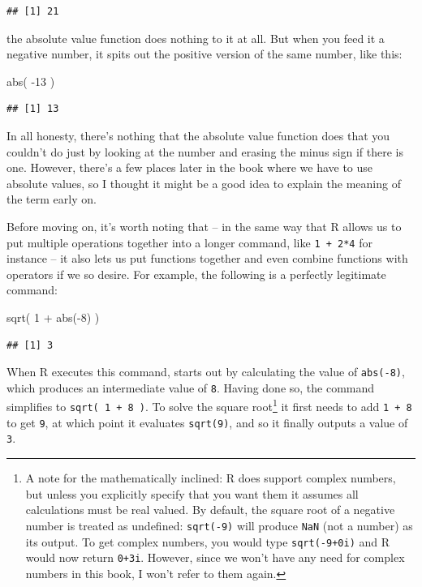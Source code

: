 \documentclass[
]{book}
\newenvironment{Shaded}{\begin{snugshade}}{\end{snugshade}}
\newcommand{\DecValTok}[1]{\textcolor[rgb]{0.00,0.00,0.81}{#1}}
\newcommand{\FunctionTok}[1]{\textcolor[rgb]{0.00,0.00,0.00}{#1}}
\newcommand{\NormalTok}[1]{#1}
\newcommand{\SpecialCharTok}[1]{\textcolor[rgb]{0.00,0.00,0.00}{#1}}
\begin{document}
\begin{verbatim}
## [1] 21
\end{verbatim}

the absolute value function does nothing to it at all. But when you feed it a negative number, it spits out the positive version of the same number, like this:

\begin{Shaded}
\begin{Highlighting}[]
\FunctionTok{abs}\NormalTok{( }\SpecialCharTok{{-}}\DecValTok{13}\NormalTok{ )}
\end{Highlighting}
\end{Shaded}

\begin{verbatim}
## [1] 13
\end{verbatim}

In all honesty, there's nothing that the absolute value function does that you couldn't do just by looking at the number and erasing the minus sign if there is one. However, there's a few places later in the book where we have to use absolute values, so I thought it might be a good idea to explain the meaning of the term early on.

Before moving on, it's worth noting that -- in the same way that R allows us to put multiple operations together into a longer command, like \texttt{1\ +\ 2*4} for instance -- it also lets us put functions together and even combine functions with operators if we so desire. For example, the following is a perfectly legitimate command:

\begin{Shaded}
\begin{Highlighting}[]
\FunctionTok{sqrt}\NormalTok{( }\DecValTok{1} \SpecialCharTok{+} \FunctionTok{abs}\NormalTok{(}\SpecialCharTok{{-}}\DecValTok{8}\NormalTok{) )}
\end{Highlighting}
\end{Shaded}

\begin{verbatim}
## [1] 3
\end{verbatim}

When R executes this command, starts out by calculating the value of \texttt{abs(-8)}, which produces an intermediate value of \texttt{8}. Having done so, the command simplifies to \texttt{sqrt(\ 1\ +\ 8\ )}. To solve the square root\footnote{A note for the mathematically inclined: R does support complex numbers, but unless you explicitly specify that you want them it assumes all calculations must be real valued. By default, the square root of a negative number is treated as undefined: \texttt{sqrt(-9)} will produce \texttt{NaN} (not a number) as its output. To get complex numbers, you would type \texttt{sqrt(-9+0i)} and R would now return \texttt{0+3i}. However, since we won't have any need for complex numbers in this book, I won't refer to them again.} it first needs to add \texttt{1\ +\ 8} to get \texttt{9}, at which point it evaluates \texttt{sqrt(9)}, and so it finally outputs a value of \texttt{3}.
\end{document}
